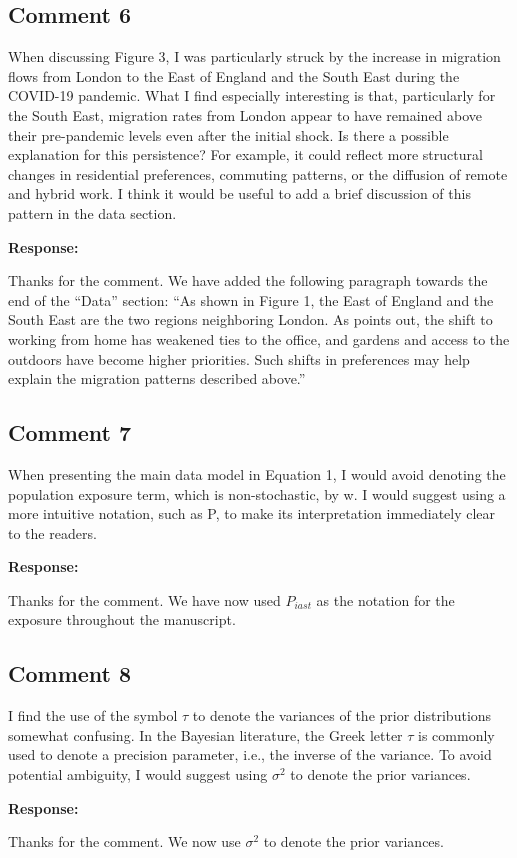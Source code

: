 \documentclass[11pt,a4paper]{article}
\newlength{\replyspace}
\newenvironment{response}{\par\addvspace{\replyspace}\nopagebreak\textbf{\textcolor{replyblue}{Response:}}\par\begingroup\color{replyblue}}{\par\endgroup\vspace{\replyspace}}
\newcommand{\refcomment}[2]{\par\Needspace{5\baselineskip}\subsection*{#1}#2\par}
\begin{document}
\refcomment{Comment 6}{
When discussing Figure 3, I was particularly struck by the increase in migration flows from London to the East of England and the South East during the COVID-19 pandemic. What I find especially interesting is that, particularly for the South East, migration rates from London appear to have remained above their pre-pandemic levels even after the initial shock. Is there a possible explanation for this persistence? For example, it could reflect more structural changes in residential preferences, commuting patterns, or the diffusion of remote and hybrid work. I think it would be useful to add a brief discussion of this pattern in the data section.
}
\begin{response}
Thanks for the comment. We have added the following paragraph towards the end of the ``Data'' section: ``As shown in Figure 1, the East of England and the South East are the two regions neighboring London. As \citet{Lange2024} points out, the shift to working from home has weakened ties to the office, and gardens and access to the outdoors have become higher priorities. Such shifts in preferences may help explain the migration patterns described above.''
\end{response}

\refcomment{Comment 7}{
When presenting the main data model in Equation 1, I would avoid denoting the population exposure term, which is non-stochastic, by w. I would suggest using a more intuitive notation, such as P, to make its interpretation immediately clear to the readers.
}
\begin{response}
Thanks for the comment. We have now used $P_{iast}$ as the notation for the exposure throughout
the manuscript.
\end{response}

\refcomment{Comment 8}{
I find the use of the symbol $\tau$ to denote the variances of the prior distributions somewhat confusing. In the Bayesian literature, the Greek letter $\tau$ is commonly used to denote a precision parameter, i.e., the inverse of the variance. To avoid potential ambiguity, I would suggest using $\sigma^2$ to denote the prior variances.
}
\begin{response}
Thanks for the comment. We now use $\sigma^2$ to denote the prior variances.
\end{response}
\end{document}
